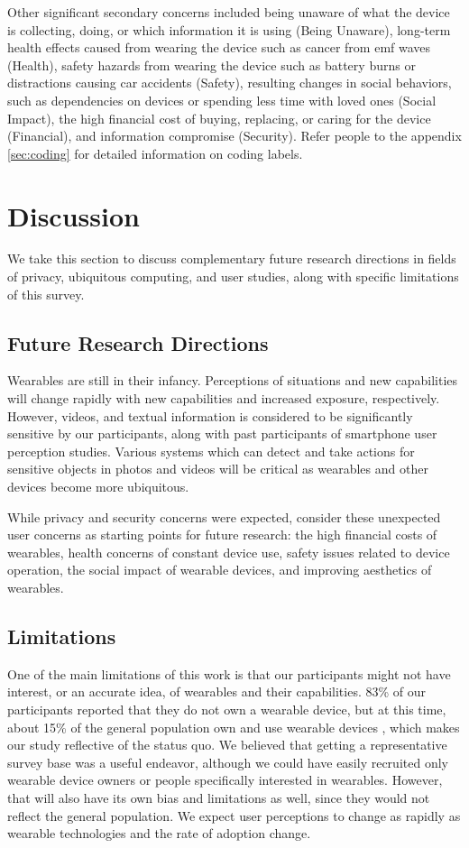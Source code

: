\documentclass{acm_proc_article-sp}
\begin{document}
Other significant secondary concerns included being unaware of what the device is collecting, doing, or which information it is using (Being Unaware), long-term health effects caused from wearing the device such as cancer from emf waves (Health), safety hazards from wearing the device such as battery burns or distractions causing car accidents (Safety), resulting changes in social behaviors, such as dependencies on devices or spending less time with loved ones (Social Impact), the high financial cost of buying, replacing, or caring for the device (Financial), and information compromise (Security). Refer people to the appendix \ref{sec:coding} for detailed information on coding labels. 


\section{Discussion}
We take this section to discuss complementary future research directions in fields of privacy, ubiquitous computing, and user studies, along with specific limitations of this survey. 

\subsection{Future Research Directions}
Wearables are still in their infancy. Perceptions of situations and new capabilities will change rapidly with new capabilities and increased exposure, respectively. However, videos, and textual information is considered to be significantly sensitive by our participants, along with past participants of smartphone user perception studies. Various systems which can detect and take actions for sensitive objects in photos and videos will be critical as wearables and other devices become more ubiquitous.

While privacy and security concerns were expected, consider these unexpected user concerns as starting points for future research: the high financial costs of wearables, health concerns of constant device use, safety issues related to device operation, the social impact of wearable devices, and improving aesthetics of wearables.  

\subsection{Limitations}
One of the main limitations of this work is that our participants might not have interest, or an accurate idea, of wearables and their capabilities. 83\% of our participants reported that they do not own a wearable device, but at this time, about 15\% of the general population own and use wearable devices \cite{Nilsen,WearableStatNews}, which makes our study reflective of the status quo. We believed that getting a representative survey base was a useful endeavor, although we could have easily recruited only wearable device owners or people specifically interested in wearables. However, that will also have its own bias and limitations as well, since they would not reflect the general population. We expect user perceptions to change as rapidly as wearable technologies and the rate of adoption change. 
\end{document}
